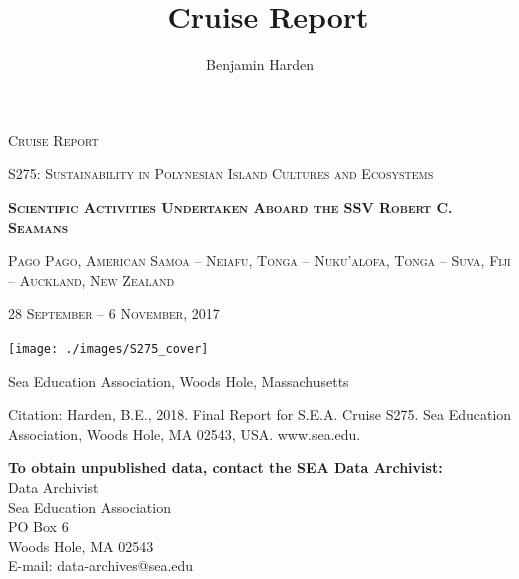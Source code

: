 \documentclass[letterpaper,11pt]{article}
\title{\cruiseID\ Cruise Report}
\author{Benjamin Harden}
\newcommand{\cruiseID}{S275}
\begin{document}
\begin{titlepage}
	\centering
        \vspace*{.3cm}
	{\scshape\LARGE Cruise Report \par}
	{\scshape\Large \cruiseID : Sustainability in Polynesian Island Cultures and Ecosystems \par}
	\vspace{1.5cm}
	{\scshape\huge\bfseries Scientific Activities Undertaken Aboard the SSV Robert C. Seamans\par}
	\vspace{1cm}
        {\scshape\Large Pago Pago, American Samoa -- Neiafu, Tonga -- Nuku'alofa, Tonga -- Suva, Fiji -- Auckland, New Zealand \par}
        {\scshape\large 28  September -- 6 November, 2017\par}
        \vspace{1cm}        
        \texttt{[image: ./images/S275\_cover]}\par
        \vspace{1cm}
	\large Sea Education Association, Woods Hole, Massachusetts
	\vfill
\end{titlepage}


\vspace*{\fill}
\noindent Citation: Harden, B.E., 2018. Final Report for S.E.A. Cruise \cruiseID . Sea Education Association, Woods Hole, MA 02543, USA. www.sea.edu.

\noindent\textbf{To obtain unpublished data, contact the SEA Data Archivist:}\\
Data Archivist\\
Sea Education Association\\
PO Box 6\\
Woods Hole, MA 02543\\
E-mail: data-archives@sea.edu\\

\clearpage
\listoffigures
\listoftables
\clearpage
\end{document}
